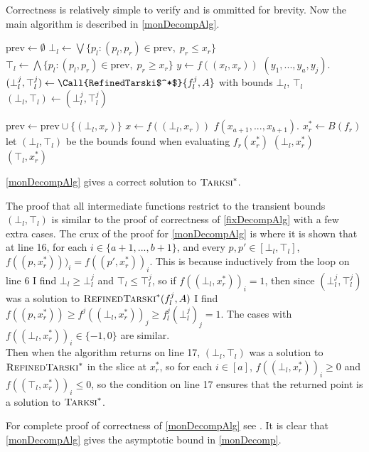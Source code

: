 Correctness is relatively simple to verify and is ommitted for brevity.
Now the main algorithm is described in \cref{monDecompAlg}.
\begin{algorithm}[h]
  \caption{\citep{chenLi}} \label{monDecompAlg}
  \begin{algorithmic}[1]
    \State $\mathrm{prev} \gets \emptyset$
      \State $\bot_l \gets \bigvee\{p_l : (p_l, p_r) \in \mathrm{prev}, \; p_r \leq x_r \}$
      \State $\top_l \gets \bigwedge\{p_l : (p_l, p_r) \in \mathrm{prev}, \; p_r \geq x_r \}$
        \State $y \gets f((x_l, x_r))$
        \State \Return $(y_1, ..., y_a, y_j)$.
      \EndProcedure
      \State $(\bot_l^j, \top_l^j) \gets \Call{RefinedTarski$^*$}{f_l^j, A}$ with bounds $\bot_l$, $\top_l$
      \State $(\bot_l, \top_l) \gets (\bot_l^j, \top_l^j)$
      \EndFor

      \State $\mathrm{prev} \gets \mathrm{prev} \cup \{(\bot_l, x_r)\}$
      \State $x \gets f((\bot_l, x_r))$
      \State \Return $f(x_{a + 1}, ..., x_{b + 1})$.
    \EndProcedure
    \State $x_r^* \gets B(f_r)$
    \State let $(\bot_l, \top_l)$ be the bounds found when evaluating $f_r(x_r^*)$
     \Return $(\bot_l, x_r^*)$ \algorithmicelse\ \Return $(\top_l, x_r^*)$ \EndIf
  \EndProcedure
  \end{algorithmic}
\end{algorithm}
\begin{lemma}
  \cref{monDecompAlg} gives a correct solution to $\textsc{Tarksi}^*$.
\end{lemma}
\begin{sproof}
The proof that all intermediate functions restrict to the transient bounds $(\bot_l, \top_l)$ is similar
to the proof of correctness of \cref{fixDecompAlg} with a few extra cases. 
  The crux of the proof for \cref{monDecompAlg} 
is \citep[Lemma 6]{chenLi}
where it is shown that at line 16, for each $i \in \{a + 1, ..., b + 1\}$, and every $p, p' \in [\bot_l, \top_l]$,
  $f((p, x_r^*)))_i = f((p', x_r^*))_i$. This is because inductively from the loop on line 6 I find
$\bot_l \geq \bot_l^j$ and $\top_l \leq \top_l^j$,
  so if $f((\bot_l, x_r^*))_i = 1$, then since $(\bot_l^j, \top_l^j)$ was a solution to
  $\textsc{RefinedTarski}^*(f_l^j, A)$ I find $f((p, x_r^*)) \geq f^j((\bot_l, x_r^*))_j \geq f_l^j(\bot_l^j)_j = 1$.
  The cases with $f((\bot_l, x_r^*))_i \in \{-1, 0 \}$ are similar. \\
  Then when the algorithm returns on line 17, $(\bot_l, \top_l)$ was a solution to
  $\textsc{RefinedTarski}^*$ in the slice at $x_r^*$, so for each $i \in [a]$, 
  $f((\bot_l, x_r^*))_i \geq 0$ and $f((\top_l, x_r^*))_i \leq 0$, so the condition on line 17
  ensures that the returned point is a solution to $\textsc{Tarksi}^*$.
\end{sproof}
For complete proof of correctness of \cref{monDecompAlg} see \citep{chenLi}. It is clear that
\cref{monDecompAlg} gives the asymptotic bound in \cref{monDecomp}.
